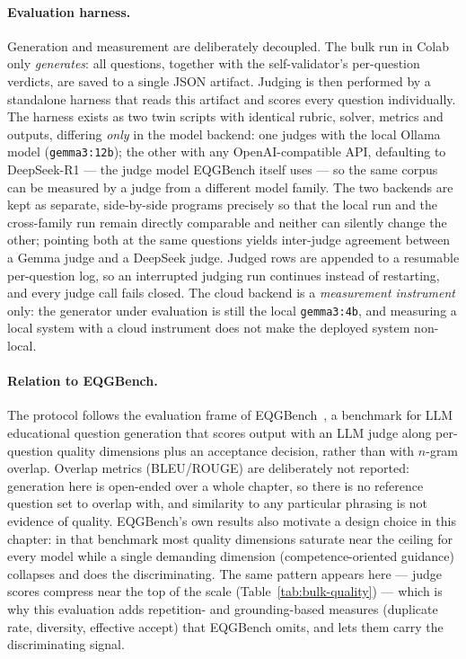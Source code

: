 \paragraph{Evaluation harness.} Generation and measurement are deliberately
decoupled. The bulk run in Colab only \emph{generates}: all questions, together
with the self-validator's per-question verdicts, are saved to a single JSON
artifact. Judging is then performed by a standalone harness that reads this
artifact and scores every question individually. The harness exists as two twin
scripts with identical rubric, solver, metrics and outputs, differing
\emph{only} in the model backend: one judges with the local Ollama model
(\texttt{gemma3:12b}); the other with any OpenAI-compatible API, defaulting to
DeepSeek-R1 --- the judge model EQGBench itself uses --- so the same corpus can
be measured by a judge from a different model family. The two backends are kept
as separate, side-by-side programs precisely so that the local run and the
cross-family run remain directly comparable and neither can silently change the
other; pointing both at the same questions yields inter-judge agreement between
a Gemma judge and a DeepSeek judge. Judged rows are appended to a resumable
per-question log, so an interrupted judging run continues instead of
restarting, and every judge call fails closed. The cloud backend is a
\emph{measurement instrument} only: the generator under evaluation is still the
local \texttt{gemma3:4b}, and measuring a local system with a cloud instrument
does not make the deployed system non-local.

\paragraph{Relation to EQGBench.} The protocol follows the evaluation frame of
EQGBench~\cite{eqgbench}, a benchmark for LLM educational question generation
that scores output with an LLM judge along per-question quality dimensions plus
an acceptance decision, rather than with $n$-gram overlap. Overlap metrics
(BLEU/ROUGE) are deliberately not reported: generation here is open-ended over a
whole chapter, so there is no reference question set to overlap with, and
similarity to any particular phrasing is not evidence of quality. EQGBench's
own results also motivate a design choice in this chapter: in that benchmark
most quality dimensions saturate near the ceiling for every model while a
single demanding dimension (competence-oriented guidance) collapses and does
the discriminating. The same pattern appears here --- judge scores compress
near the top of the scale (Table~\ref{tab:bulk-quality}) --- which is why this
evaluation adds repetition- and grounding-based measures (duplicate rate,
diversity, effective accept) that EQGBench omits, and lets them carry the
discriminating signal.

